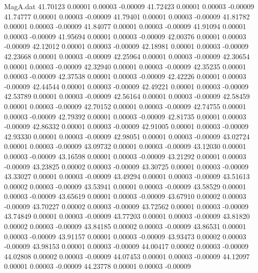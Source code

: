 \begin{filecontents}{MagA.dat}
  41.70123    0.00001    0.00003   -0.00009
  41.72423    0.00001    0.00003   -0.00009
  41.74777    0.00001    0.00003   -0.00009
  41.79401    0.00001    0.00003   -0.00009
  41.81782    0.00001    0.00003   -0.00009
  41.84077    0.00001    0.00003   -0.00009
  41.91094    0.00001    0.00003   -0.00009
  41.95694    0.00001    0.00003   -0.00009
  42.00376    0.00001    0.00003   -0.00009
  42.12012    0.00001    0.00003   -0.00009
  42.18981    0.00001    0.00003   -0.00009
  42.23668    0.00001    0.00003   -0.00009
  42.25964    0.00001    0.00003   -0.00009
  42.30654    0.00001    0.00003   -0.00009
  42.32940    0.00001    0.00003   -0.00009
  42.35235    0.00001    0.00003   -0.00009
  42.37538    0.00001    0.00003   -0.00009
  42.42226    0.00001    0.00003   -0.00009
  42.44544    0.00001    0.00003   -0.00009
  42.49221    0.00001    0.00003   -0.00009
  42.53789    0.00001    0.00003   -0.00009
  42.56164    0.00001    0.00003   -0.00009
  42.58459    0.00001    0.00003   -0.00009
  42.70152    0.00001    0.00003   -0.00009
  42.74755    0.00001    0.00003   -0.00009
  42.79392    0.00001    0.00003   -0.00009
  42.81735    0.00001    0.00003   -0.00009
  42.86332    0.00001    0.00003   -0.00009
  42.91005    0.00001    0.00003   -0.00009
  42.93330    0.00001    0.00003   -0.00009
  42.98051    0.00001    0.00003   -0.00009
  43.02724    0.00001    0.00003   -0.00009
  43.09732    0.00001    0.00003   -0.00009
  43.12030    0.00001    0.00003   -0.00009
  43.16598    0.00001    0.00003   -0.00009
  43.21292    0.00001    0.00003   -0.00009
  43.23825    0.00002    0.00003   -0.00009
  43.30725    0.00001    0.00003   -0.00009
  43.33027    0.00001    0.00003   -0.00009
  43.49294    0.00001    0.00003   -0.00009
  43.51613    0.00002    0.00003   -0.00009
  43.53941    0.00001    0.00003   -0.00009
  43.58529    0.00001    0.00003   -0.00009
  43.65619    0.00001    0.00003   -0.00009
  43.67910    0.00002    0.00003   -0.00009
  43.70227    0.00002    0.00003   -0.00009
  43.72562    0.00001    0.00003   -0.00009
  43.74849    0.00001    0.00003   -0.00009
  43.77203    0.00001    0.00003   -0.00009
  43.81820    0.00002    0.00003   -0.00009
  43.84185    0.00002    0.00003   -0.00009
  43.86531    0.00001    0.00003   -0.00009
  43.91157    0.00001    0.00003   -0.00009
  43.93473    0.00002    0.00003   -0.00009
  43.98153    0.00001    0.00003   -0.00009
  44.00417    0.00002    0.00003   -0.00009
  44.02808    0.00002    0.00003   -0.00009
  44.07453    0.00001    0.00003   -0.00009
  44.12097    0.00001    0.00003   -0.00009
  44.23778    0.00001    0.00003   -0.00009

\end{filecontents}
